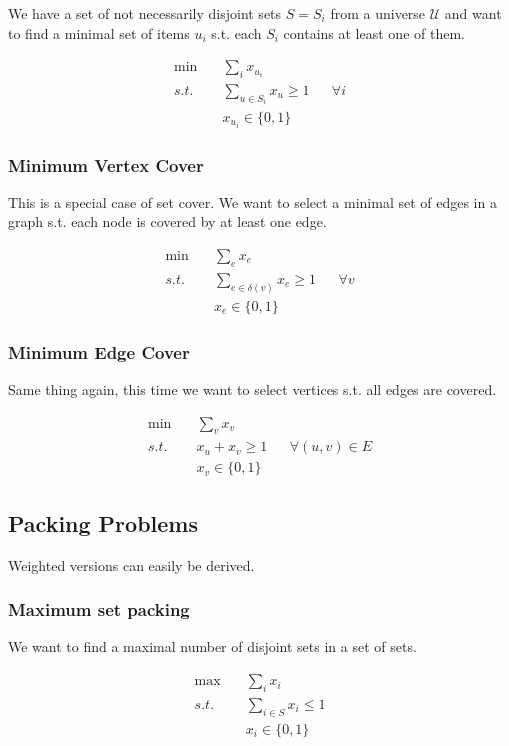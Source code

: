 We have a set of not necessarily disjoint sets $S=S_i$ from a universe $\mathcal{U}$ and want to find a minimal set of items $u_i$ s.t. each $S_i$ contains at least one of them.

\begin{align*}
\min \quad & \sum_i x_{u_i}\\
s.t. \quad & \sum_{u\in S_i} x_{u} \geq 1 && \forall i\\
	& x_{u_i} \in \{0,1\}
\end{align*}

\subsubsection{Minimum Vertex Cover}

This is a special case of set cover. We want to select a minimal set of edges in a graph s.t. each node is covered by at least one edge.

\begin{align*}
\min \quad & \sum_e x_e \\
s.t. \quad & \sum_{e\in \delta(v)} x_e \geq 1 && \forall v\\
	& x_{e} \in \{0,1\}
\end{align*}
\subsubsection{Minimum Edge Cover}

Same thing again, this time we want to select vertices s.t. all edges are covered.

\begin{align*}
\min \quad & \sum_v x_v \\
s.t. \quad & x_u+x_v \geq 1 && \forall (u,v) \in E\\
	& x_v \in \{0,1\}
\end{align*}

\subsection{Packing Problems}

Weighted versions can easily be derived.

\subsubsection{Maximum set packing}
We want to find a maximal number of disjoint sets in a set of sets.

\begin{align*}
\max \quad & \sum_{i} x_i\\
s.t. \quad & \sum_{i\in S} x_i \leq 1\\
	& x_i \in \{0,1\}
\end{align*}
